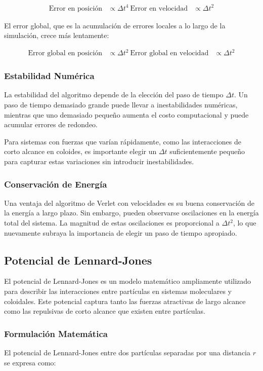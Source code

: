 \documentclass[twocolumn]{article}
\begin{document}
\begin{align}
    \text{Error en posición} &\propto \Delta t^4 \
    \text{Error en velocidad} &\propto \Delta t^2
\end{align}

El error global, que es la acumulación de errores locales a lo largo de la simulación, crece más lentamente:

\begin{align}
    \text{Error global en posición} &\propto \Delta t^2 \
    \text{Error global en velocidad} &\propto \Delta t^2
\end{align}

\subsubsection*{Estabilidad Numérica}
La estabilidad del algoritmo depende de la elección del paso de tiempo $\Delta t$. Un paso de tiempo demasiado grande puede llevar a inestabilidades numéricas, mientras que uno demasiado pequeño aumenta el costo computacional y puede acumular errores de redondeo.

Para sistemas con fuerzas que varían rápidamente, como las interacciones de corto alcance en coloides, es importante elegir un $\Delta t$ suficientemente pequeño para capturar estas variaciones sin introducir inestabilidades.

\subsubsection*{Conservación de Energía}
Una ventaja del algoritmo de Verlet con velocidades es su buena conservación de la energía a largo plazo. Sin embargo, pueden observarse oscilaciones en la energía total del sistema. La magnitud de estas oscilaciones es proporcional a $\Delta t^2$, lo que nuevamente subraya la importancia de elegir un paso de tiempo apropiado.

\subsection*{Potencial de Lennard-Jones}
El potencial de Lennard-Jones es un modelo matemático ampliamente utilizado para describir las interacciones entre partículas en sistemas moleculares y coloidales. Este potencial captura tanto las fuerzas atractivas de largo alcance como las repulsivas de corto alcance que existen entre partículas.

\subsubsection*{Formulación Matemática}
El potencial de Lennard-Jones entre dos partículas separadas por una distancia $r$ se expresa como:
\end{document}
